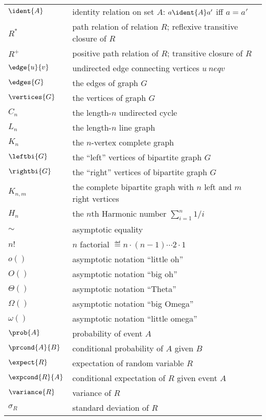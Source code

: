 \begin{center}
\begin{tabular}{ll}
$\ident{A}$    & identity relation on set $A$: $a \ident{A} a'$ iff $a = a'$\\
$R^*$          & path relation of relation $R$; reflexive transitive closure of $R$\\
$R^+$          & positive path relation of $R$; transitive closure of $R$\\
$\edge{u}{v}$  & undirected edge connecting vertices $u\ neq v$\\
$\edges{G}$    & the edges of graph $G$\\
$\vertices{G}$ & the vertices of graph $G$\\
$C_n$          & the length-$n$ undirected cycle\\
$L_n$          & the length-$n$ line graph\\
$K_n$          & the $n$-vertex complete graph\\
$\leftbi{G}$   & the ``left'' vertices of bipartite graph $G$\\
$\rightbi{G}$  & the ``right'' vertices of bipartite graph $G$\\
$K_{n,m}$       & the complete bipartite graph with $n$ left and $m$ right vertices\\
$H_n$          & the $n$th Harmonic number $\sum_{i=1}^n 1/i$\\
$\sim$         & asymptotic equality\\
$n!$           & $n$ factorial $\eqdef n \cdot (n-1) \cdots 2 \cdot 1$\\
$o()$          & asymptotic notation ``little oh''\\
$O()$          & asymptotic notation ``big oh''\\
$\Theta()$     & asymptotic notation ``Theta''\\
$\Omega()$     & asymptotic notation ``big Omega''\\
$\omega()$     & asymptotic notation ``little omega''\\
$\prob{A}$     & probability of event $A$\\
$\prcond{A}{B}$ & conditional probability of $A$ given $B$\\
$\expect{R}$   & expectation of random variable $R$\\
$\expcond{R}{A}$ & conditional expectation of $R$ given event $A$\\
$\variance{R}$ & variance of $R$\\
$\sigma_R$     & standard deviation of $R$
\end{tabular}
\end{center}


